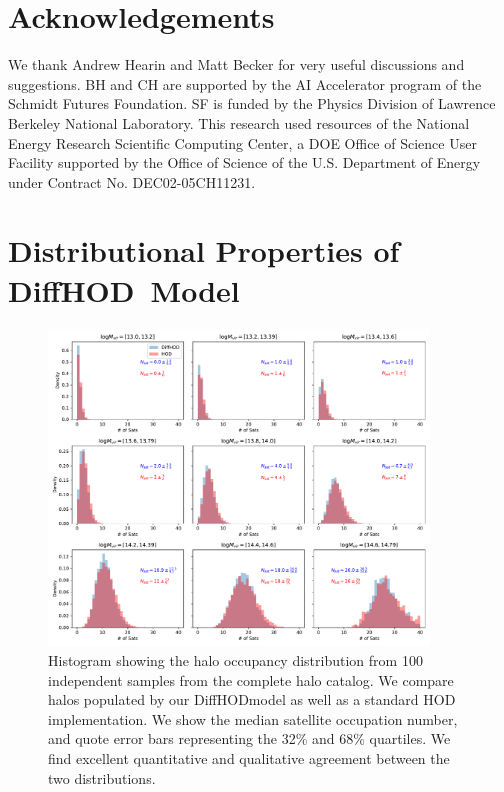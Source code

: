 \documentclass[a4paper,usenatbib]{mnras}
\newcommand{\dhod}{{\sc DiffHOD}}
\begin{document}
\section*{Acknowledgements}
We thank Andrew Hearin and Matt Becker for very useful discussions and suggestions.
BH and CH are supported by the AI Accelerator program of the Schmidt Futures Foundation. 
SF is funded by the Physics Division of Lawrence Berkeley National Laboratory.
This research used resources of the National Energy Research Scientific Computing Center, a DOE Office of Science User Facility supported by the Office of Science of the U.S. Department of Energy under Contract No. DEC02-05CH11231.









\appendix
\section{Distributional Properties of \dhod\ Model}
\label{ap:1}
\begin{figure}
    \centering
    \includegraphics[width=0.90\textwidth]{paper/plots/distributions.pdf}
    \caption{Histogram showing the halo occupancy distribution from 100 independent samples from the complete halo catalog. We compare halos populated by our \dhod model as well as a standard HOD implementation. We show the median satellite occupation number, and quote error bars representing the 32\% and 68\% quartiles. We find excellent quantitative and qualitative agreement between the two distributions. }
    \label{fig:distribution}
\end{figure}
\end{document}
